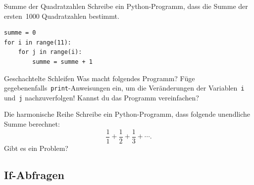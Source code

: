 \documentclass{blatt}
\begin{document}
\begin{aufgabe}{Summe der Quadratzahlen}
Schreibe ein Python-Programm, dass die Summe der ersten~1000 Quadratzahlen
bestimmt.
\end{aufgabe}

\begin{lrbox}{\foobox}\begin{minipage}{\textwidth}\begin{verbatim}
summe = 0
for i in range(11):
    for j in range(i):
        summe = summe + 1
\end{verbatim}
\end{minipage}\end{lrbox}
\begin{aufgabe}{Geschachtelte Schleifen}
Was macht folgendes Programm? Füge
gegebenenfalls~\texttt{print}-Anweisungen ein, um die Veränderungen
der Variablen~\texttt{i} und~\texttt{j}
nachzuverfolgen! Kannst du das Programm vereinfachen?

\usebox{\foobox}
\end{aufgabe}

\begin{aufgabe}{Die harmonische Reihe}
Schreibe ein Python-Programm, dass folgende unendliche Summe berechnet:
\[ \frac{1}{1} + \frac{1}{2} + \frac{1}{3} + \cdots. \]
Gibt es ein Problem?
\end{aufgabe}


\subsection{If-Abfragen}
\end{document}
